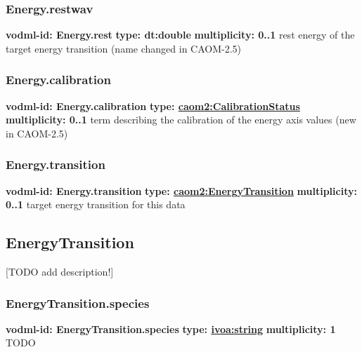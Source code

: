    \subsubsection{Energy.restwav}
      \textbf{vodml-id: Energy.rest} \newline
      \textbf{type: dt:double} \newline
      \textbf{multiplicity: 0..1} \newline
      rest energy of the target energy transition (name changed in CAOM-2.5)

    \subsubsection{Energy.calibration}
      \textbf{vodml-id: Energy.calibration} \newline
      \textbf{type: \hyperref[sect:CalibrationStatus]{caom2:CalibrationStatus}} \newline
      \textbf{multiplicity: 0..1} \newline
      term describing the calibration of the energy axis values (new in CAOM-2.5)

    \subsubsection{Energy.transition}
      \textbf{vodml-id: Energy.transition} \newline
      \textbf{type: \hyperref[sect:EnergyTransition]{caom2:EnergyTransition}} \newline
      \textbf{multiplicity: 0..1} \newline
      target energy transition for this data

  \subsection{EnergyTransition}
  \label{sect:EnergyTransition}
    [TODO add description!]

    \subsubsection{EnergyTransition.species}
      \textbf{vodml-id: EnergyTransition.species} \newline
      \textbf{type: \hyperref[sect:ivoa]{ivoa:string}} \newline
      \textbf{multiplicity: 1} \newline
      TODO


